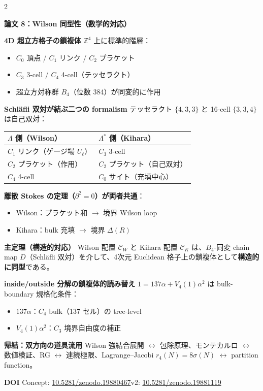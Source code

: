 \documentclass[9pt,a4paper]{ltjsarticle}
\begin{document}
\begin{multicols}{2}
\columnbreak

\textbf{\large 論文 8：Wilson 同型性（数学的対応）}

\smallskip
\textbf{4D 超立方格子の鎖複体}\enspace
$\mathbb{Z}^4$ 上に標準的階層：
\begin{itemize}[topsep=1pt]
\item $C_0$ 頂点 / $C_1$ リンク / $C_2$ プラケット
\item $C_3$ 3-cell / $C_4$ 4-cell（テッセラクト）
\item 超立方対称群 $B_4$（位数 384）が同変的に作用
\end{itemize}

\smallskip
\textbf{Schl\"afli 双対が結ぶ二つの formalism}\enspace
テッセラクト $\{4,3,3\}$ と 16-cell $\{3,3,4\}$ は自己双対：

\vspace{1pt}
{\footnotesize
\begin{tabular}{@{}ll@{}}
\toprule
$\Lambda$ 側（Wilson） & $\Lambda^*$ 側（Kihara） \\
\midrule
$C_1$ リンク（ゲージ場 $U_\ell$） & $C_3$ 3-cell \\
$C_2$ プラケット（作用） & $C_2$ プラケット（自己双対） \\
$C_4$ 4-cell & $C_0$ サイト（充填中心） \\
\bottomrule
\end{tabular}
}

\smallskip
\textbf{離散 Stokes の定理（$\partial^2=0$）が両者共通}：
\begin{itemize}[topsep=1pt]
\item Wilson：プラケット和 $\to$ 境界 Wilson loop
\item Kihara：bulk 充填 $\to$ 境界 $\Delta(R)$
\end{itemize}

\smallskip
\textbf{主定理（構造的対応）}\enspace
{\footnotesize Wilson 配置 $\mathcal{C}_W$ と Kihara 配置 $\mathcal{C}_K$ は、$B_4$-同変 chain map $D$（Schl\"afli 双対）を介して、4次元 Euclidean 格子上の鎖複体として\textbf{構造的に同型}である。}

\smallskip
\textbf{inside/outside 分解の鎖複体的読み替え}\enspace
$1 = 137\alpha + V_4(1)\alpha^2$ は bulk-boundary 規格化条件：
\begin{itemize}[topsep=1pt]
\item $137\alpha$：$C_4$ bulk（137 セル）の tree-level
\item $V_4(1)\alpha^2$：$C_3$ 境界自由度の補正
\end{itemize}

\smallskip
\textbf{帰結：双方向の道具流用}\enspace
Wilson 強結合展開 $\leftrightarrow$ 包除原理、モンテカルロ $\leftrightarrow$ 数値検証、RG $\leftrightarrow$ 連続極限、Lagrange--Jacobi $r_4(N)=8\sigma(N)$ $\leftrightarrow$ partition function。

\smallskip
\textbf{DOI}\enspace
{\scriptsize Concept: \href{https://doi.org/10.5281/zenodo.19880467}{10.5281/zenodo.19880467}\enspace v2: \href{https://doi.org/10.5281/zenodo.19881119}{10.5281/zenodo.19881119}}

\end{multicols}
\end{document}
